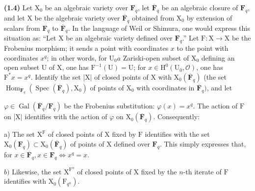 \documentclass[10pt,leqno]{article}
\begin{document}
\noindent \textbf{(1.4)} Let \(\mathrm{X}_{0}\) be an algebraic variety over \(\mathbf{F}_{q}\), let \(\overline{\mathbf{F}}_{q}\) be an algebraic closure of \(\mathbf{F}_{q}\), and let \(\mathrm{X}\) be the algebraic variety over \(\overline{\mathbf{F}}_{q}\) obtained from \(\mathrm{X}_{0}\) by extension of scalars from \(\mathbf{F}_{q}\) to \(\overline{\mathbf{F}}_{q}\). In the language of Weil or Shimura, one would express this situation as: “Let \(\mathrm{X}\) be an algebraic variety defined over \(\mathbf{F}_{q}\).” Let \(\mathrm{F}:\mathrm{X}\longrightarrow \mathrm{X}\) be the Frobenius morphism; it sends a point with coordinates \(x\) to the point with coordinates \(x^{q}\); in other words, for \(\mathrm{U}_{0} a\) Zariski-open subset of \(\mathrm{X}_{0}\) defining an open subset \(\mathrm{U}\) of \(\mathrm{X}\), one has \(\mathrm{F}^{- 1}(\mathrm{U})=\mathrm{U}\); for \(x\in \mathrm{H}^{0}(\mathrm{U}_{0},\mathcal{O})\), one has \(\mathrm{F}^{*}x=x^{q}\). Identify the set |\(\mathrm{X}|\) of closed points of \(\mathrm{X}\) with \(\mathrm{X}_{0}(\overline{\mathbf{F}}_{q})\) (the set \(\operatorname{Hom}_{\mathbf{F}_{q}}(\operatorname{Spec}(\overline{\mathbf{F}}_{q}),\mathrm{X}_{0})\) of points of \(\mathrm{X}_{0}\) with coordinates in \(\overline{\mathbf{F}}_{q})\), and let\par

\clearpage

\label{physical-4}\par\smallskip

\noindent \(\varphi \in \operatorname{Gal}(\overline{\mathbf{F}}_{q}/\mathbf{F}_{q})\) be the Frobenius substitution: \(\varphi (x)=x^{q}\). The action of \(\mathrm{F}\) on |\(\mathrm{X}|\) identifies with the action of \(\varphi \) on \(\mathrm{X}_{0}(\overline{\mathbf{F}}_{q})\). Consequently:\par

\noindent a) The set \(\mathrm{X}^{\mathrm{F}}\) of closed points of \(\mathrm{X}\) fixed by \(\mathrm{F}\) identifies with the set \(\mathrm{X}_{0}(\mathbf{F}_{q})\subset \mathrm{X}_{0}(\overline{\mathbf{F}}_{q})\) of points of \(\mathrm{X}\) defined over \(\mathbf{F}_{q}\). This simply expresses that, for \(x\in \overline{\mathbf{F}}_{q}, x\in \mathbf{F}_{q} \Leftrightarrow  x^{q}=x\).\par

\noindent \(b)\) Likewise, the set \(\mathrm{X}^{\mathrm{F}^{n}}\) of closed points of \(\mathrm{X}\) fixed by the \(n\)-th iterate of \(\mathrm{F}\) identifies with \(\mathrm{X}_{0}(\mathrm{F}_{q^{n}})\).\par
\end{document}

